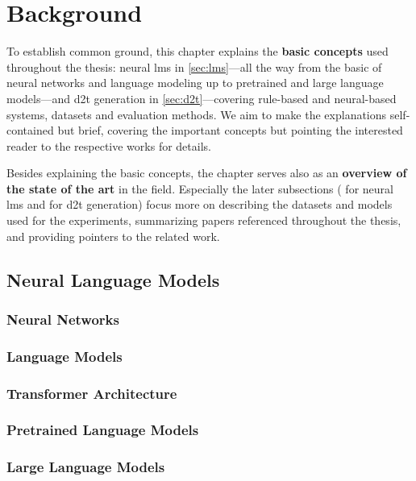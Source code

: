 
\chapter{Background}
\label{chap:background}

To establish common ground, this chapter explains the \textbf{basic concepts} used throughout the thesis: neural \acp{lm} in \autoref{sec:lms}---all the way from the basic of neural networks and language modeling up to pretrained and large language models---and \ac{d2t} generation in \autoref{sec:d2t}---covering rule-based and neural-based systems, datasets and evaluation methods. We aim to make the explanations self-contained but brief, covering the important concepts but pointing the interested reader to the respective works for details.

Besides explaining the basic concepts, the chapter serves also as an \textbf{overview of the state of the art} in the field. Especially the later subsections ( for neural \acp{lm} and  for \ac{d2t} generation) focus more on describing the datasets and models used for the experiments, summarizing papers referenced throughout the thesis, and providing pointers to the related work.


\section{Neural Language Models}
\label{sec:lms}


\subsection{Neural Networks}
\label{sec:nns}




\subsection{Language Models}
\label{sec:lm-basics}
\subsection{Transformer Architecture}
\label{sec:transformer}
\subsection{Pretrained Language Models}
\label{sec:plms}
\subsection{Large Language Models}
\label{sec:llms}
